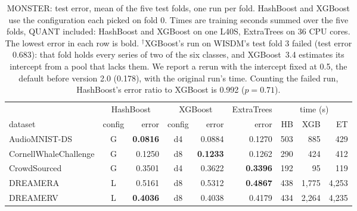 \documentclass[a4paper, 11pt]{article}
\begin{document}
\begin{table}[tbp]
    \centering
    \small
    \setlength{\tabcolsep}{4.5pt}
    \caption{MONSTER: test error, mean of the five test folds, one run per fold.
        HashBoost and XGBoost use the configuration each picked on fold 0.
        Times are training seconds summed over the five folds, QUANT included:
        HashBoost and XGBoost on one L40S, ExtraTrees on 36 CPU cores. The
        lowest error in each row is bold. $^\dagger$XGBoost's run on WISDM's
        test fold 3 failed (test error 0.683): that fold holds every series of
        two of the six classes, and XGBoost~3.4 estimates its intercept from a
        pool that lacks them. We report a rerun with the intercept fixed at
        0.5, the default before version 2.0 (0.178), with the original run's
        time. Counting the failed run, HashBoost's error ratio to XGBoost is
        0.992 ($p = 0.71$).}
    \label{tab:monster}
    \begin{tabular}{lcrcrrrrr}
        \toprule
                              & \multicolumn{2}{c}{HashBoost} & \multicolumn{2}{c}{XGBoost} & ExtraTrees & \multicolumn{3}{c}{time (s)}                                                \\
        \cmidrule(lr){2-3} \cmidrule(lr){4-5} \cmidrule(lr){7-9}
        dataset               & config                        & error                       & config     & error                        & error           & HB     & XGB     & ET      \\
        \midrule
        AudioMNIST-DS         & G                             & \textbf{0.0816}             & d4         & 0.0884                       & 0.1270          & 503    & 885     & 429     \\
        CornellWhaleChallenge & G                             & 0.1250                      & d8         & \textbf{0.1233}              & 0.1262          & 290    & 424     & 412     \\
        CrowdSourced          & G                             & 0.3501                      & d4         & 0.3622                       & \textbf{0.3396} & 192    & 95      & 119     \\
        DREAMERA              & L                             & 0.5161                      & d8         & 0.5312                       & \textbf{0.4867} & 438    & 1,775   & 4,253   \\
        DREAMERV              & L                             & \textbf{0.4036}             & d8         & 0.4038                       & 0.4179          & 434    & 2,264   & 4,235   \\

\end{tabular}
\end{table}
\end{document}
